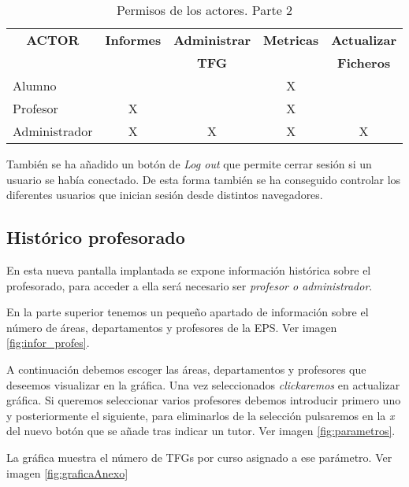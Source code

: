  \begin{table}[]
	\label{actores2}
	\centering
	\begin{tabular}{|l|c|c|c|c|}
		\hline
		\multicolumn{1}{|c|}{\textbf{ACTOR}}     &  \textbf{Informes} & \textbf{Administrar} & \textbf{Metricas} & \textbf{Actualizar}\\
		\multicolumn{1}{|c|}{}     & {} & \textbf{TFG} & {} & \textbf{Ficheros}\\\hline
		Alumno & {} & {} & X & {} \\ \hline
		Profesor  & X & {} & X   & {}  \\ \hline
		Administrador   & X & X & X  & X  \\ \hline
	\end{tabular}
	\caption{Permisos de los actores. Parte 2}
\end{table}

También se ha añadido un botón de \emph{Log out} que permite cerrar sesión si un usuario se había conectado. 
De esta forma también se ha conseguido controlar los diferentes usuarios que inician sesión desde distintos navegadores.
\subsection{Histórico profesorado}
En esta nueva pantalla implantada se expone información histórica sobre el profesorado, para acceder a ella será necesario ser \emph{profesor o administrador}.

En la parte superior tenemos un pequeño apartado de información sobre el número de áreas, departamentos y profesores de la EPS. Ver imagen \ref{fig:infor_profes}.


A continuación debemos escoger las áreas, departamentos y profesores que deseemos visualizar en la gráfica. Una vez seleccionados \emph{clickaremos} en actualizar gráfica.
Si queremos seleccionar varios profesores debemos introducir primero uno y posteriormente el siguiente, para eliminarlos de la selección pulsaremos en la \emph{x} del nuevo botón que se añade tras indicar un tutor. Ver imagen \ref{fig:parametros}.


La gráfica muestra el número de TFGs por curso asignado a ese parámetro. Ver imagen \ref{fig:graficaAnexo}


